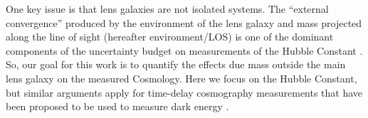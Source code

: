 One key issue is that lens galaxies are not isolated systems. The ``external convergence'' produced by the environment of the lens galaxy and mass projected along the line of sight (hereafter environment/LOS) is one of the dominant components of the uncertainty budget on measurements of the Hubble Constant \citep{Suyu12}. So, our goal for this work is to quantify the effects due mass outside the main lens galaxy on the measured Cosmology. Here we focus on the Hubble Constant, but similar arguments apply for time-delay cosmography measurements that have been proposed to be used to measure dark energy \citet{Treu13}. 